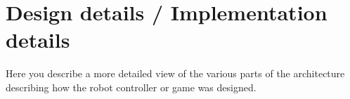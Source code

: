 \chapter{Design details / Implementation details}

Here you describe a more detailed view of the various parts of the 
architecture describing how the robot controller or game was designed.


